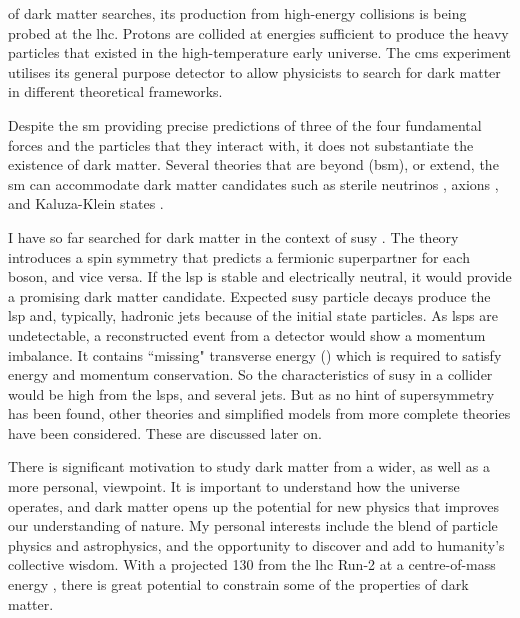  of dark matter searches, its production from high-energy collisions is being probed at the \acrshort{lhc}. Protons are collided at energies sufficient to produce the heavy particles that existed in the high-temperature early universe. The \acrfull{cms} experiment utilises its general purpose detector to allow physicists to search for dark matter in different theoretical frameworks.

Despite the \acrlong{sm} providing precise predictions of three of the four fundamental forces and the particles that they interact with, it does not substantiate the existence of dark matter. Several theories that are beyond (\acrshort{bsm}), or extend, the \acrlong{sm} can accommodate dark matter candidates such as sterile neutrinos \cite{doi:10.1142/S0218301313300191}, axions \cite{1981PhLB..104..199D}, and Kaluza-Klein states \cite{Han:1998sg}.

I have so far searched for dark matter in the context of \acrfull{susy} \cite{Martin:1997ns}. The theory introduces a spin symmetry that predicts a fermionic superpartner for each boson, and vice versa. If the \acrfull{lsp} is stable and electrically neutral, it would provide a promising dark matter candidate. Expected \acrshort{susy} particle decays produce the \acrshort{lsp} and, typically, hadronic jets because of the initial state particles. As \glspl{lsp} are undetectable, a reconstructed event from a detector would show a momentum imbalance. It contains ``missing" transverse energy () which is required to satisfy energy and momentum conservation. So the characteristics of \acrshort{susy} in a collider would be high \etmiss from the \glspl{lsp}, and several jets. But as no hint of supersymmetry has been found, other theories and simplified models from more complete theories have been considered. These are discussed later on.

There is significant motivation to study dark matter from a wider, as well as a more personal, viewpoint. It is important to understand how the universe operates, and dark matter opens up the potential for new physics that improves our understanding of nature. My personal interests include the blend of particle physics and astrophysics, and the opportunity to discover and add to humanity's collective wisdom. With a projected 130 \fbinv from the \acrshort{lhc} Run-2 at a centre-of-mass energy \comruntwo, there is great potential to constrain some of the properties of dark matter.

\fi

\newpage

